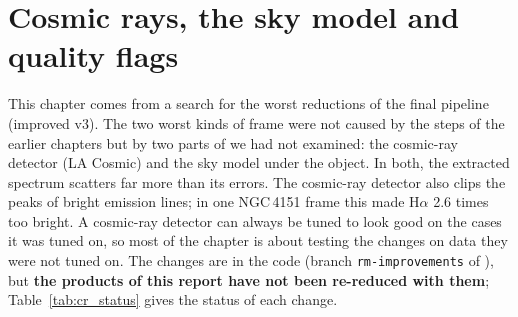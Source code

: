 \chapter{Cosmic rays, the sky model and quality flags}
\label{sec:cosmics}

This chapter comes from a search for the worst reductions of the final pipeline (improved v3). The two worst kinds of
frame were not caused by the steps of the earlier chapters but by two parts of \banzai{} we had not examined: the
cosmic-ray detector (LA Cosmic) and the sky model under the object. In both, the extracted spectrum scatters far more
than its errors. The cosmic-ray detector also clips the peaks of bright emission lines; in one NGC\,4151 frame this
made H$\alpha$ 2.6 times too bright. A cosmic-ray detector can always be tuned to look good on the cases it was tuned
on, so most of the chapter is about testing the changes on data they were not tuned on. The changes are in the code
(branch \texttt{rm-improvements} of \banzai{}), but \textbf{the products of this report have not been re-reduced with
them}; Table~\ref{tab:cr_status} gives the status of each change.

